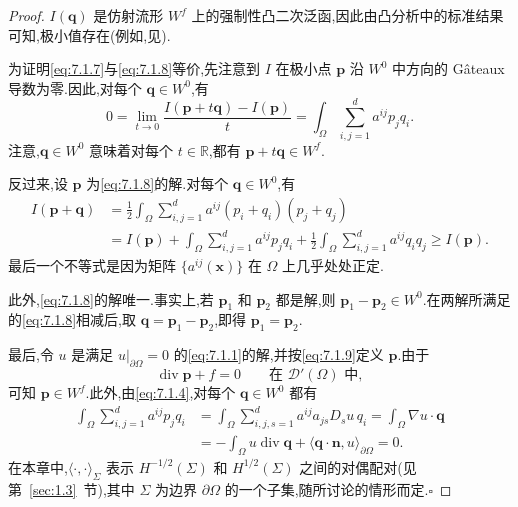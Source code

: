 \begin{proof}
\(I(\boldsymbol{q})\) 是仿射流形 \(W^f\) 上的强制性凸二次泛函,因此由凸分析中的标准结果可知,极小值存在(例如,见).

为证明\eqref{eq:7.1.7}与\eqref{eq:7.1.8}等价,先注意到 \(I\) 在极小点 \(\boldsymbol{p}\) 沿 \(W^0\) 中方向的 Gâteaux 导数为零.因此,对每个 \(\boldsymbol{q}\in W^0\),有
\[
  0=\lim_{t\to0}\frac{I(\boldsymbol{p}+t\boldsymbol{q})-I(\boldsymbol{p})}{t}
    =\int_\Omega\sum_{i,j=1}^d a^{ij}p_jq_i.
\]
注意,\(\boldsymbol{q}\in W^0\) 意味着对每个 \(t\in\mathbb R\),都有 \(\boldsymbol{p}+t\boldsymbol{q}\in W^f\).

反过来,设 \(\boldsymbol{p}\) 为\eqref{eq:7.1.8}的解.对每个 \(\boldsymbol{q}\in W^0\),有
\[
  \begin{aligned}
    I(\boldsymbol{p}+\boldsymbol{q})
      &=\frac12\int_\Omega\sum_{i,j=1}^d a^{ij}(p_i+q_i)(p_j+q_j)\\
      &=I(\boldsymbol{p})+\int_\Omega\sum_{i,j=1}^d a^{ij}p_jq_i
        +\frac12\int_\Omega\sum_{i,j=1}^d a^{ij}q_iq_j
        \ge I(\boldsymbol{p}).
  \end{aligned}
\]
最后一个不等式是因为矩阵 \(\{a^{ij}(\boldsymbol{x})\}\) 在 \(\Omega\) 上几乎处处正定.

此外,\eqref{eq:7.1.8}的解唯一.事实上,若 \(\boldsymbol{p}_1\) 和 \(\boldsymbol{p}_2\) 都是解,则 \(\boldsymbol{p}_1-\boldsymbol{p}_2\in W^0\).在两解所满足的\eqref{eq:7.1.8}相减后,取 \(\boldsymbol{q}=\boldsymbol{p}_1-\boldsymbol{p}_2\),即得 \(\boldsymbol{p}_1=\boldsymbol{p}_2\).

最后,令 \(u\) 是满足 \(u|_{\partial\Omega}=0\) 的\eqref{eq:7.1.1}的解,并按\eqref{eq:7.1.9}定义 \(\boldsymbol{p}\).由于
\[
  \operatorname{div}\boldsymbol{p}+f=0\qquad\text{在 }\mathcal D'(\Omega)\text{ 中},
\]
可知 \(\boldsymbol{p}\in W^f\).此外,由\eqref{eq:7.1.4},对每个 \(\boldsymbol{q}\in W^0\) 都有
\[
  \begin{aligned}
    \int_\Omega\sum_{i,j=1}^d a^{ij}p_jq_i
      &=\int_\Omega\sum_{i,j,s=1}^d a^{ij}a_{js}D_su\,q_i
       =\int_\Omega\nabla u\cdot\boldsymbol{q}\\
      &=-\int_\Omega u\operatorname{div}\boldsymbol{q}
        +\langle\boldsymbol{q}\cdot\boldsymbol{n},u\rangle_{\partial\Omega}=0.
  \end{aligned}
\]
在本章中,\(\langle\cdot,\cdot\rangle_\Sigma\) 表示 \(H^{-1/2}(\Sigma)\) 和 \(H^{1/2}(\Sigma)\) 之间的对偶配对(见第~\ref{sec:1.3}~节),其中 \(\Sigma\) 为边界 \(\partial\Omega\) 的一个子集,随所讨论的情形而定.\hfill\(\square\)
\end{proof}

